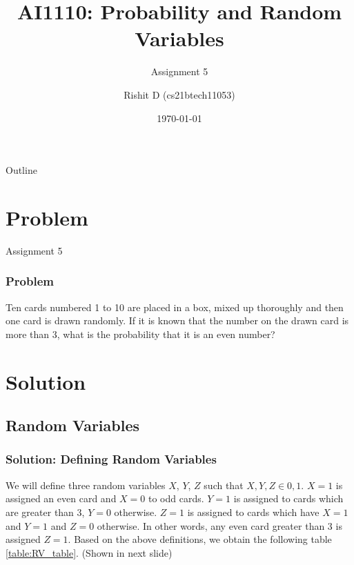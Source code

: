 \documentclass{beamer}
\title{AI1110: Probability and Random Variables}
\subtitle{Assignment 5}
\author{Rishit D (cs21btech11053)}
\institute{IIT Hyderabad}
\date{\today}
\begin{document}
\begin{frame}
    \titlepage 
\end{frame}

\begin{frame}{Outline}
    \tableofcontents
\end{frame}

\section{Problem}

\begin{frame}{Assignment 5}
  \frametitle{Problem}
  Ten cards numbered 1 to 10 are placed in a box, mixed up thoroughly and then one card is drawn randomly. If it is known that the number on the drawn card is more than 3, what is the probability that it is an even number?
\end{frame}

\section{Solution}
\subsection{Random Variables}

\begin{frame}
  \frametitle{Solution: Defining Random Variables}
  We will define three random variables $X$, $Y$, $Z$ such that $X, Y, Z \in {0, 1}$.
  $X = 1$ is assigned an even card and $X = 0$ to odd cards.
  $Y = 1$ is assigned to cards which are greater than 3, $Y = 0$ otherwise.
  $Z = 1$ is assigned to cards which have $X = 1$ and $Y = 1$ and $Z = 0$ otherwise. In other words, any even card greater than 3 is assigned $Z = 1$.
  Based on the above definitions, we obtain the following table
  \eqref{table:RV_table}.
  (Shown in next slide)
\end{frame}
\end{document}
